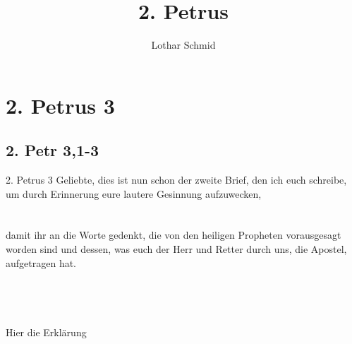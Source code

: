 \documentclass[12pt]{mybib}
\title{2. Petrus}
\author{Lothar Schmid}
\date{}
\begin{document}
\mytitlepage
\tableofcontents

\section{2. Petrus 3}

\subsection{2. Petr 3,1-3}
 \begin{auslegung}{2. Petrus 3} 
        Geliebte, dies ist nun schon der zweite Brief, den ich euch schreibe, um durch Erinnerung eure lautere Gesinnung aufzuwecken,
        \switchcolumn
        \\
        \\
        \\
        \switchcolumn*
        damit ihr an die Worte gedenkt, die von den heiligen Propheten vorausgesagt worden sind und dessen, was euch der Herr und Retter durch uns, die Apostel, aufgetragen hat.
        \switchcolumn
        \\
        \\
        \\
        \\
        \\
        \switchcolumn*
        Hier die Erklärung
    \end{auslegung}
\end{document}
